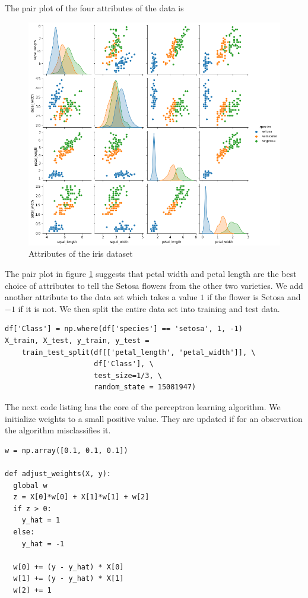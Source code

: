 \documentclass{article}
\numberwithin{equation}{section}
\begin{document}
The pair plot of the four attributes of the data is
\begin{figure}[!ht]
\centering
\includegraphics[scale=0.4]{iris}
\caption{Attributes of the iris dataset}
\label{f2}
\end{figure}

The pair plot in figure \ref{f2} suggests that petal width and petal length
are the best choice of attributes to tell the Setosa flowers from the other
two varieties. We add another attribute to the data set which takes a value
$1$ if the flower is Setosa and $-1$ if it is not. We then split the entire
data set into training and test data.

\begin{verbatim}
df['Class'] = np.where(df['species'] == 'setosa', 1, -1)
X_train, X_test, y_train, y_test = 
	train_test_split(df[['petal_length', 'petal_width']], \
                     df['Class'], \
                     test_size=1/3, \
                     random_state = 15081947)
\end{verbatim}

The next code listing has the core of the perceptron learning algorithm. We 
initialize weights to a small positive value. They are updated if for an 
observation the algorithm misclassifies it.
\begin{verbatim}
w = np.array([0.1, 0.1, 0.1]) 

def adjust_weights(X, y):
  global w
  z = X[0]*w[0] + X[1]*w[1] + w[2]
  if z > 0:
    y_hat = 1
  else:
    y_hat = -1
    
  w[0] += (y - y_hat) * X[0]
  w[1] += (y - y_hat) * X[1]
  w[2] += 1
\end{verbatim}
\end{document}
